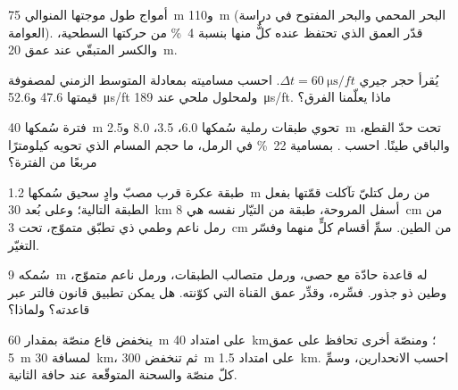 \begin{exercise}[$\star$]\label{exo:b3:facies-models:4}
أمواج طول موجتها المنوالي \qty{75}{m} و\qty{110}{m} (البحر المحمي والبحر المفتوح
في دراسة العوامة). قدّر العمق الذي تحتفظ عنده كلٌّ منها بنسبة
\qty{4}{\percent} من حركتها السطحية، والكسر المتبقّي عند عمق
\qty{20}{m}.
\end{exercise}

\begin{exercise}[$\star\star$]\label{exo:b3:facies-models:5}
يُقرأ حجر جيري $\Delta t = \qty{60}{\micro\second/ft}$. احسب مساميته
بمعادلة المتوسط الزمني لمصفوفة قيمتها 47.6
و\qty{52.6}{\micro\second/ft} ولمحلول ملحي عند \qty{189}{\micro\second/ft}. ماذا
يعلّمنا الفرق؟
\end{exercise}

\begin{exercise}[$\star\star$]\label{exo:b3:facies-models:6}
فترة سُمكها \qty{40}{m} تحوي طبقات رملية سُمكها 6.0، 3.5، 8.0 و\qty{2.5}{m}
تحت حدّ القطع، والباقي طينًا. احسب . بمسامية
\qty{22}{\percent} في الرمل، ما حجم المسام الذي تحويه
كيلومترًا مربعًا من الفترة؟
\end{exercise}

\begin{exercise}[$\star\star$]\label{exo:b3:facies-models:7}
طبقة عكرة قرب مصبّ وادٍ سحيق سُمكها \qty{1.2}{m} من رمل كتليّ
 تآكلت قمّتها بفعل الطبقة التالية؛ وعلى بُعد \qty{30}{km} أسفل المروحة، طبقة
من التيّار نفسه هي \qty{8}{cm} من رمل ناعم وطمي ذي تطبّق متموّج، تحت
\qty{3}{cm} من الطين. سمِّ أقسام كلٍّ منهما وفسّر التغيّر.
\end{exercise}

\begin{exercise}[$\star\star$]\label{exo:b3:facies-models:8}
 سُمكه \qty{9}{m} له قاعدة حادّة مع حصى،
ورمل متصالب الطبقات، ورمل ناعم متموّج، وطين ذو جذور. فسِّره، وقدِّر
عمق القناة التي كوّنته. هل يمكن تطبيق قانون فالتر عبر قاعدته؟
ولماذا؟
\end{exercise}

\begin{exercise}[$\star\star$]\label{exo:b3:facies-models:9}
ينخفض قاع منصّة بمقدار \qty{60}{m} على امتداد \qty{40}{km}؛ ومنصّة أخرى
تحافظ على عمق \qty{5}{m} لمسافة \qty{30}{km}، ثم تنخفض \qty{300}{m} على
امتداد \qty{1.5}{km}. احسب الانحدارين، وسمِّ كلّ منصّة والسحنة
المتوقّعة عند حافة الثانية.
\end{exercise}

